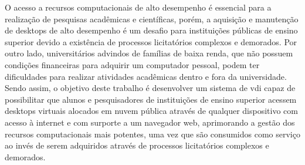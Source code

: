 
\begin{resumoutfpr}

O acesso a recursos computacionais de alto desempenho é essencial para a realização de pesquisas acadêmicas e científicas, porém, a aquisição e manutenção de \glspl{desktop} de alto desempenho é um desafio para instituições públicas de ensino superior devido a existência de processos licitatórios complexos e demorados. Por outro lado, universitários advindos de famílias de baixa renda, que não possuem condições financeiras para adquirir um computador pessoal, podem ter dificuldades para realizar atividades acadêmicas dentro e fora da universidade. Sendo assim, o objetivo deste trabalho é desenvolver um sistema de \gls{vdi} capaz de possibilitar que alunos e pesquisadores de instituições de ensino superior acessem \glspl{desktop} virtuais alocados em nuvem pública através de qualquer dispositivo com acesso à internet e com surporte a um navegador web, aprimorando a gestão dos recursos computacionais mais potentes, uma vez que são consumidos como serviço ao invés de serem adquiridos através de processos licitatórios complexos e demorados.



 
 
 

\end{resumoutfpr}

